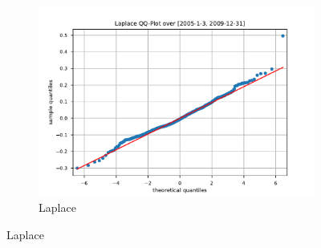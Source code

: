 \begin{figure}[htbp]
\begin{subfigure}[b]{0.32\textwidth}
        \includegraphics[width=\textwidth]{content/reschap4/Figures/laplace_QQ_2005-1-3-2009-12-31.pdf}
        \caption{\small Laplace}
    \end{subfigure}


\end{figure}
